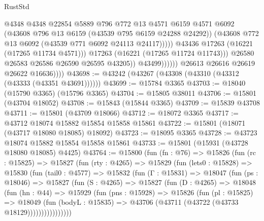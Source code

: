 \begin{lexlean}{RustStd}
\begin{coremodule}
                                      @4348
                                      @4348
                                      @22854
                                      @5889
                                      @796
                                      @772
                                      @13
                                      @4571
                                      @6159
                                      @4571
                                      @6092
                                      (@43608 @796 @13 @6159 (@43539 @795 @6159 @24288 @24292))
                                      (@43608 @772 @13 @6092 (@43539 @771 @6092 @24113 @24117)))))
                                @43436
                                @17263
                                (@16221 (@17265 @11734 @4571)))
                              @17263
                              (@16221 (@17265 @11724 @11743)))
                            @26580
                            @26583
                            @26586
                            @26590
                            @26595
                            @43205))
                        @43499))))))
            @26613
            @26616
            @26619
            @26622
            @16636))))
@43698 := @43242 (@43267 (@43308 (@43310 (@43312 (@43333 (@43351 @43691))))))
@43699 := @15784 @3365
@43703 := @18040 (@15790 @3365) (@15796 @3365)
@43704 := @15805 @38011
@43706 := @15801 (@43704 @18052)
@43708 := @15843 (@15844 @3365)
@43709 := @15839 @43708
@43711 := @15801 (@43709 @18066)
@43712 := @18072 @3365
@43717 := @43712 @18074 @15882 @15854 @15858 @15861
@43722 := @15801 (@18071 (@43717 @18080 @18085) @18092)
@43723 := @18095 @3365
@43728 := @43723 @18074 @15882 @15854 @15858 @15861
@43733 := @15801 (@15931 (@43728 @18080 @18085) @4425)
@43764 := @15800
    (fun (fn : @76) =>
    @15826
      (fun (rc : @15825) =>
      @15827
        (fun (rty : @4265) =>
        @15829
          (fun (lets0 : @15828) =>
          @15830
            (fun (tail0 : @4577) =>
            @15832
              (fun (Γ : @15831) =>
              @18047
                (fun (ps : @18046) =>
                @15827
                  (fun (S : @4265) =>
                  @15827
                    (fun (D : @4265) =>
                    @18048
                      (fun (hn : @44) =>
                      @15929
                        (fun (pns : @15928) =>
                        @15826
                          (fun (pl : @15825) =>
                          @18049
                            (fun (bodyL : @15835) =>
                            @43706 (@43711 (@43722 (@43733 @18129))))))))))))))))

\end{coremodule}
\end{lexlean}

